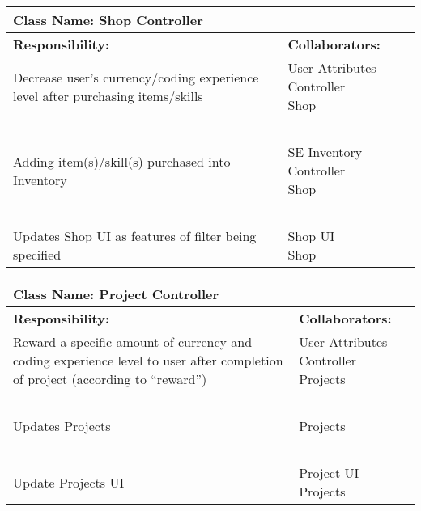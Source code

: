 \documentclass[]{article}
\begin{document}
\begin{table}[H]
    \centering
    \begin{tabular}{|p{7.5cm}|p{7.5cm}|}
        \hline
        \multicolumn{2}{|l|}{\textbf{Class Name:} Shop Controller}\\
        \hline
        \textbf{Responsibility:} & \textbf{Collaborators:}\\
        \hline
        Decrease user’s currency/coding experience level after purchasing items/skills & \makecell[l]{User Attributes Controller\\Shop}\\
        ~ & ~\\
        Adding item(s)/skill(s) purchased into Inventory & \makecell[l]{SE Inventory Controller\\Shop}\\
        ~ & ~\\
        Updates Shop UI as features of filter being specified & \makecell[l]{Shop UI\\Shop}\\
        \hline
    \end{tabular}
\end{table}

\begin{table}[H]
    \centering
    \begin{tabular}{|p{7.5cm}|p{7.5cm}|}
        \hline
        \multicolumn{2}{|l|}{\textbf{Class Name:} Project Controller}\\
        \hline
        \textbf{Responsibility:} & \textbf{Collaborators:}\\
        \hline
        Reward a specific amount of currency and coding experience level to user after completion of project (according to “reward”) & \makecell[l]{User Attributes Controller\\Projects}\\
        ~ & ~\\
        Updates Projects & Projects\\
        ~ & ~\\
        Update Projects UI & \makecell[l]{Project UI\\Projects}\\
        \hline
    \end{tabular}
\end{table}
\end{document}
